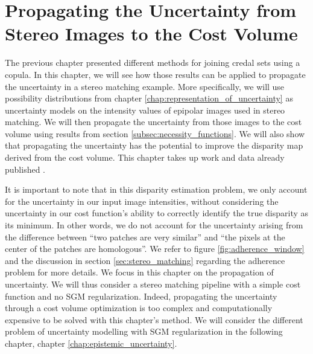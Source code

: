 \chapter{Propagating the Uncertainty from Stereo Images to the Cost Volume}\label{chap:propagating}
The previous chapter presented different methods for joining credal sets using a copula. In this chapter, we will see how those results can be applied to propagate the uncertainty in a stereo matching example. More specifically, we will use possibility distributions from chapter \ref{chap:representation_of_uncertainty} as uncertainty models on the intensity values of epipolar images used in stereo matching. We will then propagate the uncertainty from those images to the cost volume using results from section \ref{subsec:necessity_functions}. We will also show that propagating the uncertainty has the potential to improve the disparity map derived from the cost volume. This chapter takes up work and data already published \cite{malinowski_copulas_2022, malinowski_uncertainty_2023}.

It is important to note that in this disparity estimation problem, we only account for the uncertainty in our input image intensities, without considering the uncertainty in our cost function's ability to correctly identify the true disparity as its minimum. In other words, we do not account for the uncertainty arising from the difference between ``two patches are very similar'' and ``the pixels at the center of the patches are homologous''. We refer to figure \ref{fig:adherence_window} and the discussion in section \ref{sec:stereo_matching} regarding the adherence problem for more details. We focus in this chapter on the propagation of uncertainty. We will thus consider a stereo matching pipeline with a simple cost function and no SGM regularization. Indeed, propagating the uncertainty through a cost volume optimization is too complex and computationally expensive to be solved with this chapter's method. We will consider the different problem of uncertainty modelling with SGM regularization in the following chapter, chapter \ref{chap:epistemic_uncertainty}. 

